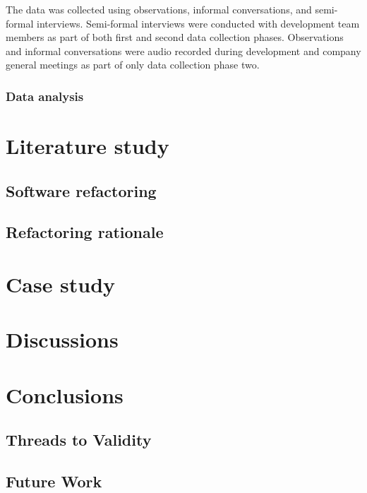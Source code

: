 \documentclass[english,12pt,a4paper,pdftex,sci,utf8]{aaltothesis}
\begin{document}
The data was collected using observations, informal conversations, and semi-formal interviews. Semi-formal interviews were conducted with development team members as part of both first and second data collection phases. Observations and informal conversations were audio recorded during development and company general meetings as part of only data collection phase two.

\subsubsection{Data analysis} \label{data analysis}

\clearpage

\section{Literature study} \label{literature}
\subsection{Software refactoring}
\subsection{Refactoring rationale}


\section{Case study} \label{case study}


\section{Discussions} \label{discussions}
\section{Conclusions} \label{conclusions}
\subsection{Threads to Validity} \label{validity}
\subsection{Future Work} \label{future}

\clearpage
\end{document}
